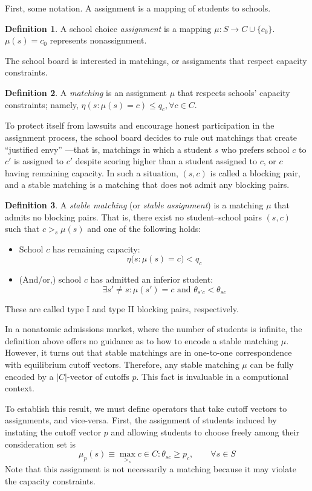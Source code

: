 \documentclass[12pt]{article}
\theoremstyle{definition}
\newtheorem{definition}{Definition}
\begin{document}
First, some notation. A assignment is a mapping of students to schools.
\begin{definition}
A school choice \emph{assignment} is a mapping $\mu: S \to C \cup \{c_0\}$. $\mu(s) = c_0$ represents nonassignment.
\end{definition}
The school board is interested in matchings, or assignments that respect capacity constraints. 
\begin{definition}
A \emph{matching} is an assignment $\mu$ that respects schools' capacity constraints; namely, $\eta (s: \mu(s) = c) \leq q_c, \forall c \in C$. 
\end{definition}
To protect itself from lawsuits and encourage honest participation in the assignment process, the school board decides to rule out matchings that create ``justified envy'' \parencite[][7]{expandingchoice}---that is, matchings in which a student $s$ who prefers school $c$ to $c'$ is assigned to $c'$ despite scoring higher than a student assigned to $c$, or $c$ having remaining capacity. In such a situation, $(s, c)$ is called a blocking pair, and a stable matching is a matching that does not admit any blocking pairs.
\begin{definition}
A \emph{stable matching} (or \emph{stable assignment}) is a matching $\mu$ that admits no blocking pairs. That is, there exist no student--school pairs $(s, c)$ such that $c >_s \mu(s)$ and one of the following holds:
\begin{itemize}
\item School $c$ has remaining capacity:
\[\eta\bigl(s: \mu(s) = c \bigr) < q_c\]
\item (And/or,) school $c$ has admitted an inferior student:
\[\exists s' \neq s: \mu(s') = c \text{ and } \theta_{s'c} < \theta_{sc}\] 
\end{itemize}
These are called type I and type II blocking pairs, respectively.
\end{definition}

In a nonatomic admissions market, where the number of students is infinite, the definition above offers no guidance as to how to encode a stable matching $\mu$. However, it turns out that stable matchings are in one-to-one correspondence with equilibrium cutoff vectors. Therefore, any stable matching $\mu$ can be fully encoded by a $|C|$-vector of cutoffs $p$. This fact is invaluable in a computional context.

To establish this result, we must define operators that take cutoff vectors to assignments, and vice-versa. First, the assignment of students induced by instating the cutoff vector $p$ and allowing students to choose freely among their consideration set is
\[\mu_p(s) \equiv \max_{>_s} c \in C : \theta_{sc} \geq p_c, \qquad \forall s \in S\] 
Note that this assignment is not necessarily a matching because it may violate the capacity constraints. 
\end{document}
